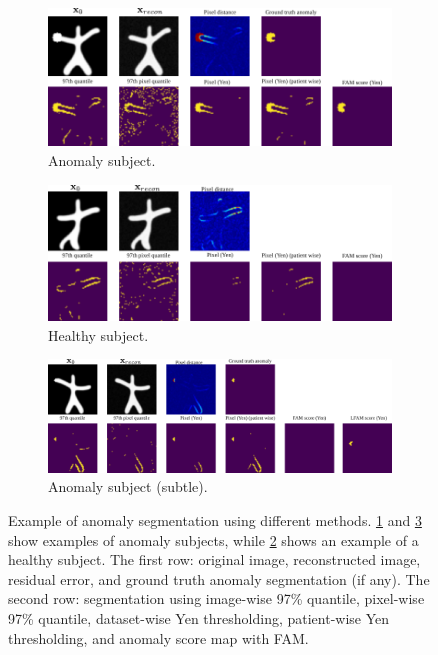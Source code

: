 \begin{figure}[htbp]
    \centering
    \begin{subfigure}{0.75\textwidth}
        \centering
        \includegraphics[width=1.0\linewidth]{figures/compare-pix-seg-gcircle.pdf}
        \caption{Anomaly subject.}
        \label{fig:example-seg-gcircle}
    \end{subfigure}
    \hfill
    \begin{subfigure}{0.75\textwidth}
        \centering
        \includegraphics[width=1.0\linewidth]{figures/compare-pix-seg-healthy.pdf}
        \caption{Healthy subject.}
        \label{fig:example-seg-healthy}
    \end{subfigure}
    \hfill
    \begin{subfigure}{0.75\textwidth}
    \centering
    \includegraphics[width=1.0\linewidth]{figures/compare-pix-seg-healthy-false-neg.pdf}
    \caption{Anomaly subject (subtle).}
    \label{fig:example-seg-gcircle-false-neg}
\end{subfigure}
    \caption[Example of anomaly segmentation with different methods]{Example of anomaly segmentation using different methods. \cref{fig:example-seg-gcircle} and \cref{fig:example-seg-gcircle-false-neg} show examples of anomaly subjects, while \cref{fig:example-seg-healthy} shows an example of a healthy subject. The first row: original image, reconstructed image, residual error, and ground truth anomaly segmentation (if any). The second row: segmentation using image-wise 97\% quantile, pixel-wise 97\% quantile, dataset-wise Yen thresholding, patient-wise Yen thresholding, and anomaly score map with \ac{FAM}.}
    \label{fig:example-seg}
\end{figure}

